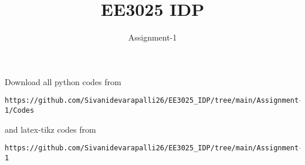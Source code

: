 \documentclass[journal,12pt,twocolumn]{IEEEtran}
\begin{document}
     \def\rightbox#1{\makebox[0in][r]{#1}}
     \def\centbox#1{\makebox[0in]{#1}}
     \def\topbox#1{\raisebox{-\baselineskip}[0in][0in]{#1}}
     \def\midbox#1{\raisebox{-0.5\baselineskip}[0in][0in]{#1}}
\vspace{3cm}
\title{EE3025 IDP}
\author{Assignment-1}
\maketitle
\newpage
\bigskip
\renewcommand{\thefigure}{\theenumi}
\renewcommand{\thetable}{\theenumi}
Download all python codes from 
\begin{lstlisting}
https://github.com/Sivanidevarapalli26/EE3025_IDP/tree/main/Assignment-1/Codes
\end{lstlisting}
%
and latex-tikz codes from 
%
\begin{lstlisting}
https://github.com/Sivanidevarapalli26/EE3025_IDP/tree/main/Assignment-1
\end{lstlisting}
\end{document}
